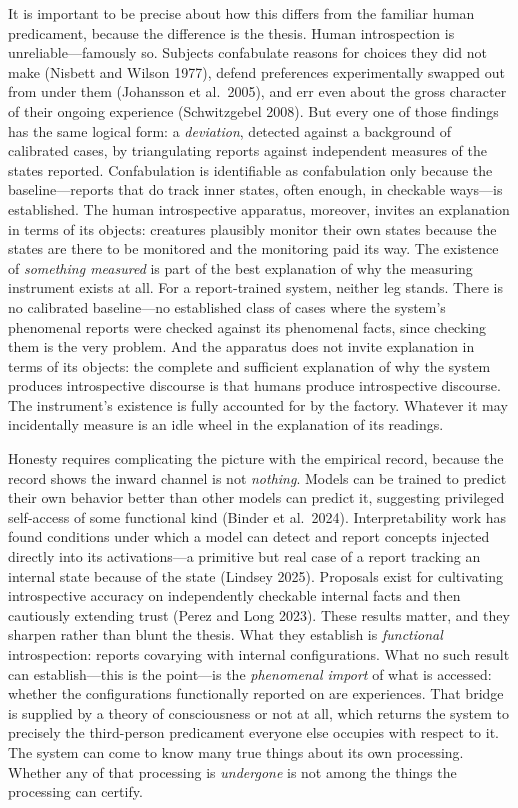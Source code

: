 \documentclass[11pt]{article}
\begin{document}
It is important to be precise about how this differs from the familiar human predicament, because the difference is the thesis. Human introspection is unreliable---famously so. Subjects confabulate reasons for choices they did not make (Nisbett and Wilson 1977), defend preferences experimentally swapped out from under them (Johansson et al.\ 2005), and err even about the gross character of their ongoing experience (Schwitzgebel 2008). But every one of those findings has the same logical form: a \emph{deviation}, detected against a background of calibrated cases, by triangulating reports against independent measures of the states reported. Confabulation is identifiable as confabulation only because the baseline---reports that do track inner states, often enough, in checkable ways---is established. The human introspective apparatus, moreover, invites an explanation in terms of its objects: creatures plausibly monitor their own states because the states are there to be monitored and the monitoring paid its way. The existence of \emph{something measured} is part of the best explanation of why the measuring instrument exists at all. For a report-trained system, neither leg stands. There is no calibrated baseline---no established class of cases where the system's phenomenal reports were checked against its phenomenal facts, since checking them is the very problem. And the apparatus does not invite explanation in terms of its objects: the complete and sufficient explanation of why the system produces introspective discourse is that humans produce introspective discourse. The instrument's existence is fully accounted for by the factory. Whatever it may incidentally measure is an idle wheel in the explanation of its readings.

Honesty requires complicating the picture with the empirical record, because the record shows the inward channel is not \emph{nothing}. Models can be trained to predict their own behavior better than other models can predict it, suggesting privileged self-access of some functional kind (Binder et al.\ 2024). Interpretability work has found conditions under which a model can detect and report concepts injected directly into its activations---a primitive but real case of a report tracking an internal state because of the state (Lindsey 2025). Proposals exist for cultivating introspective accuracy on independently checkable internal facts and then cautiously extending trust (Perez and Long 2023). These results matter, and they sharpen rather than blunt the thesis. What they establish is \emph{functional} introspection: reports covarying with internal configurations. What no such result can establish---this is the point---is the \emph{phenomenal import} of what is accessed: whether the configurations functionally reported on are experiences. That bridge is supplied by a theory of consciousness or not at all, which returns the system to precisely the third-person predicament everyone else occupies with respect to it. The system can come to know many true things about its own processing. Whether any of that processing is \emph{undergone} is not among the things the processing can certify.
\end{document}
